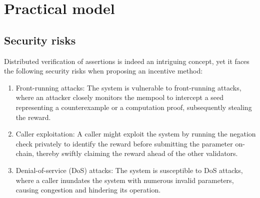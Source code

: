 \documentclass[runningheads]{llncs}
\begin{document}



\section{Practical model}
\subsection{Security risks}
Distributed verification of assertions is indeed an intriguing concept, yet it faces the following security risks when proposing an incentive method:

\begin{enumerate}
\item Front-running attacks: The system is vulnerable to front-running attacks, where an attacker closely monitors the mempool to intercept a seed representing a counterexample or a computation proof, subsequently stealing the reward.
\item Caller exploitation: A caller might exploit the system by running the negation check privately to identify the reward before submitting the parameter on-chain, thereby swiftly claiming the reward ahead of the other validators. 
\item Denial-of-service (DoS) attacks: The system is susceptible to DoS attacks, where a caller inundates the system with numerous invalid parameters, causing congestion and hindering its operation.
\end{enumerate}
\end{document}

